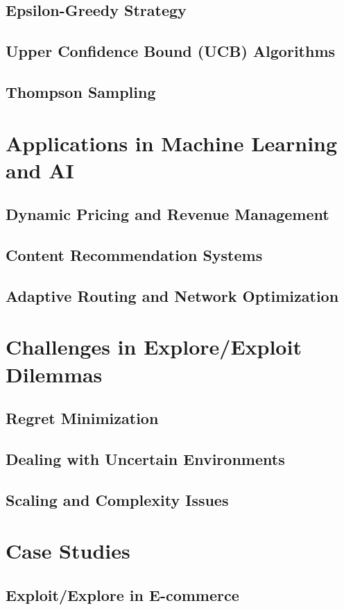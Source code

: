 \documentclass[12pt]{book} %
\begin{document}
\subsection{Epsilon-Greedy Strategy}
\subsection{Upper Confidence Bound (UCB) Algorithms}
\subsection{Thompson Sampling}

\section{Applications in Machine Learning and AI}
\subsection{Dynamic Pricing and Revenue Management}
\subsection{Content Recommendation Systems}
\subsection{Adaptive Routing and Network Optimization}

\section{Challenges in Explore/Exploit Dilemmas}
\subsection{Regret Minimization}
\subsection{Dealing with Uncertain Environments}
\subsection{Scaling and Complexity Issues}

\section{Case Studies}
\subsection{Exploit/Explore in E-commerce}
\end{document}
